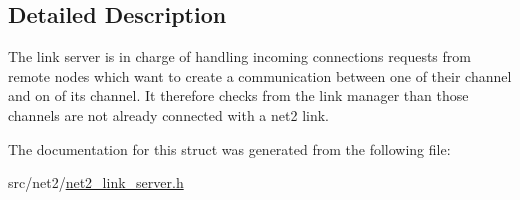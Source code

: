 \subsection{Detailed Description}
The link server is in charge of handling incoming connections requests from remote nodes which want to create a communication between one of their channel and on of its channel. It therefore checks from the link manager than those channels are not already connected with a net2 link. 

The documentation for this struct was generated from the following file\+:\begin{DoxyCompactItemize}
\item 
src/net2/\hyperlink{net2__link__server_8h}{net2\+\_\+link\+\_\+server.\+h}\end{DoxyCompactItemize}
